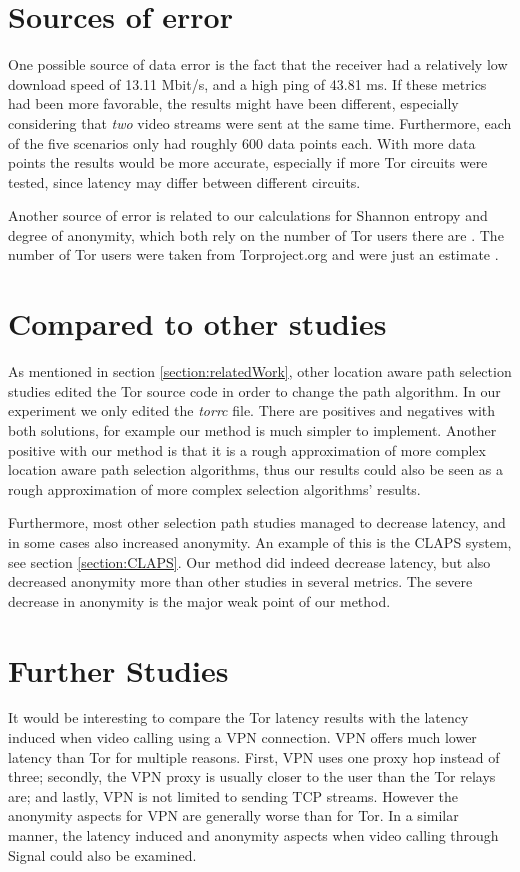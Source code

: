 \documentclass{kththesis}
\begin{document}
\section{Sources of error}
One possible source of data error is the fact that the receiver had a relatively low download speed of 13.11 Mbit/s, and a high ping of 43.81 ms. If these metrics had been more favorable, the results might have been different, especially considering that \emph{two} video streams were sent at the same time. Furthermore, each of the five scenarios only had roughly 600 data points each. With more data points the results would be more accurate, especially if more Tor circuits were tested, since latency may differ between different circuits.

Another source of error is related to our calculations for Shannon entropy and degree of anonymity, which both rely on the number of Tor users there are \parencite{tormetricsUserStats}. The number of Tor users were taken from Torproject.org and were just an estimate \parencite{tormetricsAboutUserMetrics}.

\section{Compared to other studies}
As mentioned in section \ref{section:relatedWork}, other location aware path selection studies edited the Tor source code in order to change the path algorithm. In our experiment we only edited the \emph{torrc} file. There are positives and negatives with both solutions, for example our method is much simpler to implement. Another positive with our method is that it is a rough approximation of more complex location aware path selection algorithms, thus our results could also be seen as a rough approximation of more complex selection algorithms' results.

Furthermore, most other selection path studies managed to decrease latency, and in some cases also increased anonymity. An example of this is the CLAPS system, see section \ref{section:CLAPS}. Our method did indeed decrease latency, but also decreased anonymity more than other studies in several metrics. The severe decrease in anonymity is the major weak point of our method.

\section{Further Studies}
It would be interesting to compare the Tor latency results with the latency induced when video calling using a VPN connection. VPN offers much lower latency than Tor for multiple reasons. First, VPN uses one proxy hop instead of three; secondly, the VPN proxy is usually closer to the user than the Tor relays are; and lastly, VPN is not limited to sending TCP streams. However the anonymity aspects for VPN are generally worse than for Tor. In a similar manner, the latency induced and anonymity aspects when video calling through Signal could also be examined.
\end{document}
